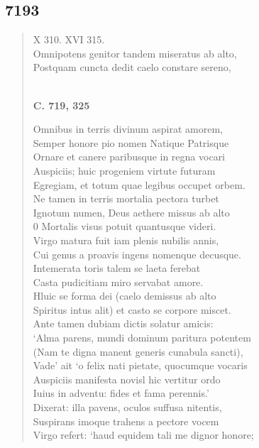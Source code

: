 \documentclass[11pt, a4paper]{report}
\begin{document}
            \subsection*{7193}
      \begin{verse}
      X 310. XVI 315. \\ Omnipotens genitor tandem miseratus ab alto, \\ Postquam cuncta dedit caelo constare sereno, \\ 
        ﻿\pagebreak 
    \begin{center} \textbf{C. 719, 325} \end{center} \marginpar{[185]} Omnibus in terris divinum aspirat amorem, \\ Semper honore pio nomen Natique Patrisque \\ Ornare et canere paribusque in regna vocari \\ Auspiciis; huic progeniem virtute futuram \\ Egregiam, et totum quae legibus occupet orbem. \\ Ne tamen in terris mortalia pectora turbet \\ Ignotum numen, Deus aethere missus ab alto \\ 0 Mortalis visus potuit quantusque videri. \\ Virgo matura fuit iam plenis nubilis annis, \\ Cui genus a proavis ingens nomenque decusque. \\ Intemerata toris talem se laeta ferebat \\ Casta pudicitiam miro servabat amore. \\ Hluic se forma dei (caelo demissus ab alto \\ Spiritus intus alit) et casto se corpore miscet. \\ Ante tamen dubiam dictis solatur amicis: \\ ‘Alma parens, mundi dominum paritura potentem \\ (Nam te digna manent generis cunabula sancti), \\ Vade’ ait ‘o felix nati pietate, quocumque vocaris \\ Auspiciis manifesta novisl hic vertitur ordo \\ Iuius in adventu: fides et fama perennis.’ \\ Dixerat: illa pavens, oculos suffusa nitentis, \\ Suspirans imoque trahens a pectore vocem \\ Virgo refert: ‘haud equidem tali me dignor honore; \\ 

\end{verse}
\end{document}
